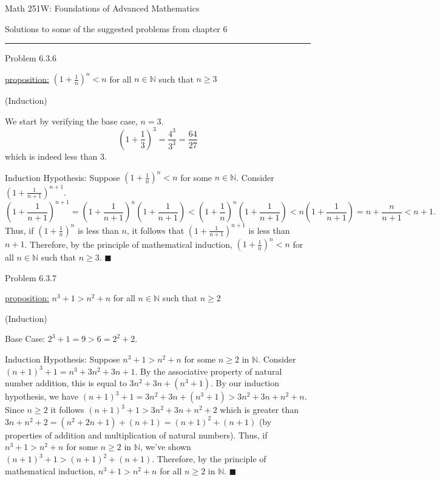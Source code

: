 \documentclass{article}
\theoremstyle{definition}
\newcommand{\N}{\mathbb{N}}
\begin{document}
	\begin{center}
		\Large{Math 251W: Foundations of Advanced Mathematics}

		\normalsize Solutions to some of the suggested problems from chapter 6\hrule
		\vspace{0.4cm}


	\end{center}



	\noindent Problem 6.3.6  \vspace{0.3cm}

	\underline{proposition:} $\left(1+\frac{1}{n}\right)^n<n$ for all $n\in \N$ such that $n\ge 3$

	\vspace{0.2cm}

	 (Induction)

	We start by verifying the base case, $n=3$.  $$(1+\frac{1}{3})^3=\frac{4^3}{3^3}=\frac{64}{27}$$ which is indeed less than $3$.

	Induction Hypothesis: Suppose $\left(1+\frac{1}{n}\right)^n<n$ for some $n\in \N$. Consider $\left(1+\frac{1}{n+1}\right)^{n+1}.$  $$\left(1+\frac{1}{n+1}\right)^{n+1}=\left(1+\frac{1}{n+1}\right)^{n}\left(1+\frac{1}{n+1}\right)<\left(1+\frac{1}{n}\right)^{n}\left(1+\frac{1}{n+1}\right)<n(1+\frac{1}{n+1})=n+\frac{n}{n+1}<n+1.$$
	Thus, if $\left(1+\frac{1}{n}\right)^n$ is less than $n$, it follows that $\left(1+\frac{1}{n+1}\right)^{n+1}$ is less than $n+1$. Therefore, by the principle of mathematical induction, $\left(1+\frac{1}{n}\right)^n<n$ for all $n\in \N$ such that $n\ge 3$. $\blacksquare$




	\vspace{1cm}

	\noindent Problem 6.3.7  \vspace{0.3cm}

	\underline{proposition:} $n^3+1>n^2+n$ for all $n\in \N$ such that $n\ge 2$

	\vspace{0.2cm}

	 (Induction)

	Base Case: $2^3+1=9>6=2^2+2$.

	Induction Hypothesis: Suppose $n^3+1>n^2+n$ for some $n\ge 2$  in $\N$. Consider $(n+1)^3+1=n^3+3n^2+3n+1$. By the associative property of natural number addition, this is equal to $3n^2+3n+(n^3+1)$. By our induction hypothesis, we have $(n+1)^3+1=3n^2+3n+(n^3+1)>3n^2+3n+n^2+n.$  Since $n\ge 2$ it follows $(n+1)^3+1>3n^2+3n+n^2+2$ which is greater than $3n+n^2+2=(n^2+2n+1)+(n+1)=(n+1)^2+(n+1)$ (by properties of addition and multiplication of natural numbers). Thus, if $n^3+1>n^2+n$ for some $n\ge 2$ in $\N$, we've shown $(n+1)^3+1>(n+1)^2+(n+1)$. Therefore, by the principle of mathematical induction, $n^3+1>n^2+n$ for all $n\ge 2$ in $\N.$  $\blacksquare$
	\vspace{1cm}
\end{document}
